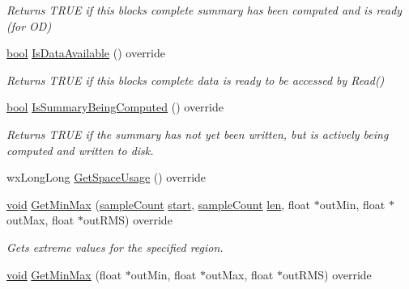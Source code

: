 \begin{DoxyCompactItemize}
\begin{DoxyCompactList}\small\item\em Returns T\+R\+UE if this block\textquotesingle{}s complete summary has been computed and is ready (for OD) \end{DoxyCompactList}\item 
\hyperlink{mac_2config_2i386_2lib-src_2libsoxr_2soxr-config_8h_abb452686968e48b67397da5f97445f5b}{bool} \hyperlink{class_o_d_decode_block_file_adb995dff9bfdebb4dda458aa469289af}{Is\+Data\+Available} () override
\begin{DoxyCompactList}\small\item\em Returns T\+R\+UE if this block\textquotesingle{}s complete data is ready to be accessed by Read() \end{DoxyCompactList}\item 
\hyperlink{mac_2config_2i386_2lib-src_2libsoxr_2soxr-config_8h_abb452686968e48b67397da5f97445f5b}{bool} \hyperlink{class_o_d_decode_block_file_a865340633204112fa48b2040b81becfb}{Is\+Summary\+Being\+Computed} () override
\begin{DoxyCompactList}\small\item\em Returns T\+R\+UE if the summary has not yet been written, but is actively being computed and written to disk. \end{DoxyCompactList}\item 
wx\+Long\+Long \hyperlink{class_o_d_decode_block_file_a0760d0a35b49e1cd54ef24b06baad9a0}{Get\+Space\+Usage} () override
\item 
\hyperlink{sound_8c_ae35f5844602719cf66324f4de2a658b3}{void} \hyperlink{class_o_d_decode_block_file_accf9f62efe678804afaa8807e020fb2a}{Get\+Min\+Max} (\hyperlink{include_2audacity_2_types_8h_afa427e1f521ea5ec12d054e8bd4d0f71}{sample\+Count} \hyperlink{seqread_8c_ac503262ae470564980711da4f78b1181}{start}, \hyperlink{include_2audacity_2_types_8h_afa427e1f521ea5ec12d054e8bd4d0f71}{sample\+Count} \hyperlink{lib_2expat_8h_af86d325fecfc8f47b61fbf5a5146f582}{len}, float $\ast$out\+Min, float $\ast$out\+Max, float $\ast$out\+R\+MS) override
\begin{DoxyCompactList}\small\item\em Gets extreme values for the specified region. \end{DoxyCompactList}\item 
\hyperlink{sound_8c_ae35f5844602719cf66324f4de2a658b3}{void} \hyperlink{class_o_d_decode_block_file_a1f281b587e3fa2e60f6d9eaa302e609e}{Get\+Min\+Max} (float $\ast$out\+Min, float $\ast$out\+Max, float $\ast$out\+R\+MS) override

\end{DoxyCompactItemize}
